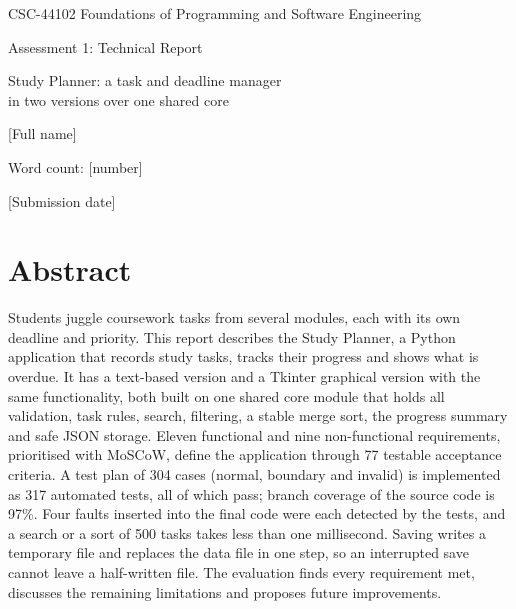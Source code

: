 \documentclass[11pt,a4paper]{article}
\providecommand{\studentname}{[Full name]}
\providecommand{\studentnumber}{[Student number]}
\providecommand{\reportwordcount}{[number]}
\providecommand{\submissiondate}{[Submission date]}
\begin{document}
\hypersetup{pageanchor=false}  %

\begin{titlepage}
  \centering
  {\Large CSC-44102 Foundations of Programming and Software Engineering\par}
  \vspace{1em}
  {\Large Assessment 1: Technical Report\par}
  \vspace{2em}
  {\LARGE Study Planner: a task and deadline manager\\
  in two versions over one shared core\par}
  \vfill
  \studentname\par
  \studentnumber\par
  \vspace{1em}
  Word count: \reportwordcount\par
  \vspace{1em}
  \submissiondate\par
\end{titlepage}
\hypersetup{pageanchor=true}


\section*{Abstract}
Students juggle coursework tasks from several modules, each with its own
deadline and priority. This report describes the Study Planner, a Python
application that records study tasks, tracks their progress and shows what
is overdue. It has a text-based version and a Tkinter graphical version with
the same functionality, both built on one shared core module that holds all
validation, task rules, search, filtering, a stable merge sort, the progress
summary and safe JSON storage. Eleven functional and nine non-functional
requirements, prioritised with MoSCoW, define the application through 77
testable acceptance criteria. A test plan of 304 cases (normal, boundary and
invalid) is implemented as 317 automated tests, all of which pass; branch
coverage of the source code is 97\%. Four faults inserted into the final code
were each detected by the tests, and a search or a sort of 500 tasks takes
less than one millisecond. Saving writes a temporary file and replaces the
data file in one step, so an interrupted save cannot leave a half-written
file. The evaluation finds every requirement met, discusses the remaining
limitations and proposes future improvements.
\end{document}
